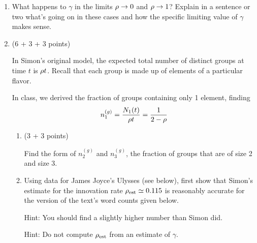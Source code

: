 \begin{enumerate}

  
   \solutionstart


   \solutionend

\item 
  What happens to $\gamma$ in the limits $\rho \rightarrow 0$
  and $\rho \rightarrow 1$?  Explain in a sentence or 
  two what's going on in these cases and how the specific limiting
  value of $\gamma$ makes sense.

  
   \solutionstart


   \solutionend

\item (6 + 3 + 3 points)

  In Simon's original model, the expected total number of distinct
  groups at time $t$ is $\rho t$.
  Recall that each group is made up of elements of a particular flavor.

  In class, we derived the fraction of groups containing
  only 1 element, finding
  $$
  n^{(g)}_1 =
  \frac{
    N_{1}(t)}
       {\rho t}
       = \frac{1}{2-\rho}
       $$

       \begin{enumerate}
       \item (3 + 3 points)

         Find the form of $n^{(g)}_2$ and $n^{(g)}_3$,
         the fraction of groups that are of size 2 and size 3.
         
         
   \solutionstart


   \solutionend

       \item 
         Using data for James Joyce's Ulysses (see below), 
         first show that Simon's estimate for
         the innovation rate $\rho_{\rm est} \simeq 0.115$
         is reasonably accurate for the version of the text's word counts
         given below.
         
         Hint: You should find a slightly higher number
         than Simon did.

         Hint: Do not compute $\rho_{\rm est}$ from
         an estimate of $\gamma$.


\end{enumerate}
\end{enumerate}
